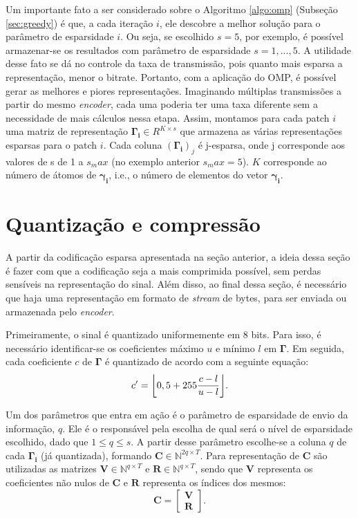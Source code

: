 \documentclass[cic,tc]{iiufrgs}
\renewcommand{\vec}[1]{\bm{#1}}
\newcommand{\mat}[1]{\bm{#1}}
\DeclarePairedDelimiter{\floor}{\lfloor}{\rfloor}
\begin{document}
Um importante fato a ser considerado sobre o Algoritmo \ref{algo:omp} (Subseção \ref{sec:greedy}) 
é que, a cada iteração $i$,
ele descobre a melhor solução para o parâmetro de esparsidade $i$. Ou seja, se escolhido $s=5$,
por exemplo, é possível armazenar-se os resultados com parâmetro de esparsidade $s=1,...,5$. 
A utilidade desse fato se dá no controle da taxa de transmissão, pois quanto mais esparsa a 
representação, menor o bitrate. 
Portanto, com a aplicação do OMP, é possível gerar as melhores e piores representações.
Imaginando múltiplas transmissões a partir do mesmo \textit{encoder}, cada uma poderia ter 
uma taxa diferente sem a necessidade de mais cálculos nessa etapa.
Assim, montamos para cada patch $i$ uma matriz de representação $\mat{\Gamma_i} \in R^{K \times s}$
que armazena as várias representações esparsas para o patch $i$. Cada coluna $(\mat{\Gamma_i})_j$ é 
j-esparsa, onde j corresponde aos valores de s de 1 a $s_max$ (no exemplo anterior $s_max = 5$). 
$K$ corresponde ao número de átomos de $\vec{\gamma_i}$, 
i.e., o número de elementos do vetor $\vec{\gamma_i}$. 

\section{Quantização e compressão}
A partir da codificação esparsa apresentada na seção anterior, a ideia dessa seção é 
fazer com que a codificação seja a mais comprimida possível, sem perdas sensíveis
na representação do sinal.
Além disso, ao final dessa seção, é necessário que haja uma representação em formato de 
\textit{stream} de bytes, para ser enviada ou armazenada pelo \textit{encoder}.

Primeiramente, o sinal é quantizado uniformemente em 8 bits. 
Para isso, é necessário identificar-se os coeficientes máximo $u$ e mínimo $l$ em $\mat{\Gamma}$.
Em seguida, cada coeficiente $c$ de $\mat{\Gamma}$ é quantizado de acordo com a seguinte equação:
\begin{equation*}
    c' = \floor*{0,5 + 255\frac{c - l}{u - l}}.
\end{equation*}

Um dos parâmetros que entra em ação é o parâmetro de esparsidade de envio da informação, $q$. 
Ele é o responsável pela escolha de qual será o nível de esparsidade escolhido,
dado que $1 \le q \le s$.
A partir desse parâmetro escolhe-se a coluna $q$ de cada $\mat{\Gamma_i}$ (já quantizada), 
formando $\mat{C} \in \mathbb{N}^{2q \times T}$.
Para representação de $\mat{C}$ são utilizadas as matrizes $\mat{V} \in \mathbb{N}^{q \times T}$ e
$\mat{R} \in \mathbb{N}^{q \times T}$, sendo que $\mat{V}$ representa os coeficientes não nulos de
$\mat{C}$ e $\mat{R}$ representa os índices dos mesmos:
\begin{equation*}
    \mat{C} = 
    \begin{bmatrix}
        \mat{V} \\
        \mat{R}
    \end{bmatrix}.
\end{equation*}
\end{document}
